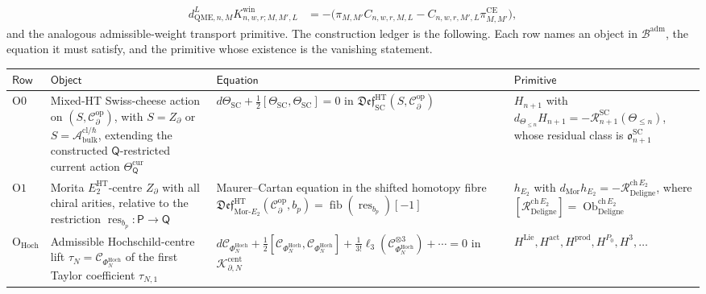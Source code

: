 \begin{thm}
\[\begin{aligned}
  d^{L}_{\mathrm{QME},n,M}K^{\mathrm{win}}_{n,w,r;M,M',L}
  &=
  -\bigl(\pi_{M,M'}C_{n,w,r,M,L}
    -C_{n,w,r,M',L}\pi^{\mathrm{CE}}_{M,M'}\bigr),
  \end{aligned}
\]
and the analogous admissible-weight transport primitive.  The construction ledger is the
following.  Each row names an object in \(\mathcal B^{\mathrm{adm}}\),
the equation it must satisfy, and the primitive whose existence is the
vanishing statement.
\begin{center}
\scriptsize
\renewcommand{\arraystretch}{1.2}
\begin{tabular}{@{}p{}|p{}|p{}|p{}@{}}
\(\mathsf{Row}\) & \(\mathsf{Object}\) & \(\mathsf{Equation}\) &
\(\mathsf{Primitive}\)\\\hline
\(\mathrm{O0}\) &
Mixed-HT Swiss-cheese action on
\((S,\mathcal C^{\mathrm{op}}_\partial)\), with
\(S=Z_\partial\) or
\(S=\mathcal A^{\mathrm{cl}/\hbar}_{\mathrm{bulk}}\), extending the
constructed \(\mathsf Q\)-restricted current action
\(\Theta_{\mathsf Q}^{\mathrm{cur}}\) &
\(d\Theta_{\mathrm{SC}}+
\frac12[\Theta_{\mathrm{SC}},\Theta_{\mathrm{SC}}]=0\) in
\(\mathfrak{Def}^{\mathrm{HT}}_{\mathrm{SC}}
(S,\mathcal C^{\mathrm{op}}_\partial)\) &
\(H_{n+1}\) with
\(d_{\Theta_{\le n}}H_{n+1}
=-\mathcal R^{\mathrm{SC}}_{n+1}(\Theta_{\le n})\), whose residual class
is \(\mathfrak o^{\mathrm{SC}}_{n+1}\)\\
\(\mathrm{O1}\) &
Morita \(E_2^{\mathrm{HT}}\)-centre
\(Z_\partial\) with all chiral arities, relative to the restriction
\(\operatorname{res}_{b_p}\colon\mathsf P\to\mathsf Q\) &
Maurer--Cartan equation in the shifted homotopy fibre
\(\mathfrak{Def}^{\mathrm{HT}}_{\mathrm{Mor}\mbox{-}E_2}
(\mathcal C^{\mathrm{op}}_\partial,b_p)
=\operatorname{fib}(\operatorname{res}_{b_p})[-1]\) &
\(h_{E_2}\) with
\(d_{\mathrm{Mor}}h_{E_2}
=-\mathcal R^{\mathrm{ch}\,E_2}_{\mathrm{Deligne}}\), where
\([\mathcal R^{\mathrm{ch}\,E_2}_{\mathrm{Deligne}}]
=\operatorname{Ob}^{\mathrm{ch}\,E_2}_{\mathrm{Deligne}}\)\\
\(\mathrm{O}_{\mathrm{Hoch}}\) &
Admissible Hochschild-centre lift
\(\tau_N=\mathcal C_{\Phi_N^{\mathrm{Hoch}}}\) of the first Taylor
coefficient \(\tau_{N,1}\) &
\(d\mathcal C_{\Phi_N^{\mathrm{Hoch}}}
+\frac12[\mathcal C_{\Phi_N^{\mathrm{Hoch}}},
\mathcal C_{\Phi_N^{\mathrm{Hoch}}}]
+\frac1{3!}\ell_3(\mathcal C_{\Phi_N^{\mathrm{Hoch}}}^{\otimes3})
+\cdots=0\) in
\(\mathcal K^{\mathrm{cent}}_{\partial,N}\) &
\(H^{\mathrm{Lie}},H^{\mathrm{act}},H^{\mathrm{prod}},H^{P_0},H^3,\ldots\)

\end{tabular}
\end{center}
\end{thm}
